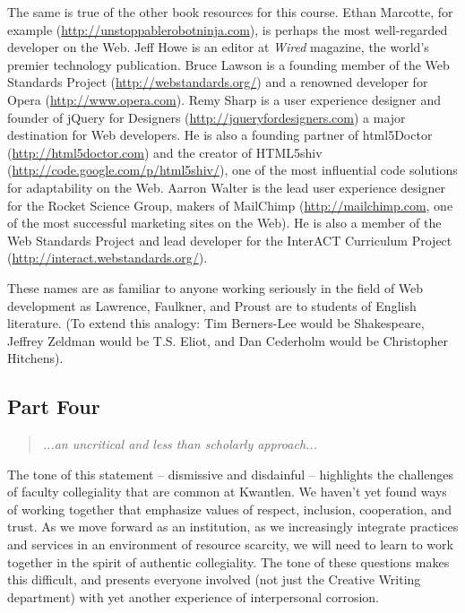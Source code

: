 \documentclass[letterpaper,10pt,headsepline]{scrreprt}
\begin{document}
The same is true of the other book resources for this course. Ethan Marcotte, for example (\url{http://unstoppablerobotninja.com}), is perhaps the most well-regarded developer on the Web. Jeff Howe is an editor at \textit{Wired} magazine, the world's premier technology publication. Bruce Lawson is a founding member of the Web Standards Project (\url{http://webstandards.org/}) and a renowned developer for Opera (\url{http://www.opera.com}). Remy Sharp is a user experience designer and founder of jQuery for Designers (\url{http://jqueryfordesigners.com}) a major destination for Web developers. He is also a founding partner of html5Doctor (\url{http://html5doctor.com}) and the creator of HTML5shiv (\url{http://code.google.com/p/html5shiv/}), one of the most influential code solutions for adaptability on the Web. Aarron Walter is the lead user experience designer for the Rocket Science Group, makers of MailChimp (\url{http://mailchimp.com}, one of the most successful marketing sites on the Web). He is also a member of the Web Standards Project and lead developer for the InterACT Curriculum Project (\url{http://interact.webstandards.org/}).

These names are as familiar to anyone working seriously in the field of Web development as Lawrence, Faulkner, and Proust are to students of English literature. (To extend this analogy: Tim Berners-Lee would be Shakespeare, Jeffrey Zeldman would be T.S. Eliot, and Dan Cederholm would be Christopher Hitchens).

\subsection{Part Four}

\begin{quote}
\textit{...an uncritical and less than scholarly approach...}
\end{quote}

The tone of this statement -- dismissive and disdainful -- highlights the challenges of faculty collegiality that are common at Kwantlen. We haven't yet found ways of working together that emphasize values of respect, inclusion, cooperation, and trust. As we move forward as an institution, as we increasingly integrate practices and services in an environment of resource scarcity, we will need to learn to work together in the spirit of authentic collegiality. The tone of these questions makes this difficult, and presents everyone involved (not just the Creative Writing department) with yet another experience of interpersonal corrosion.
\end{document}
